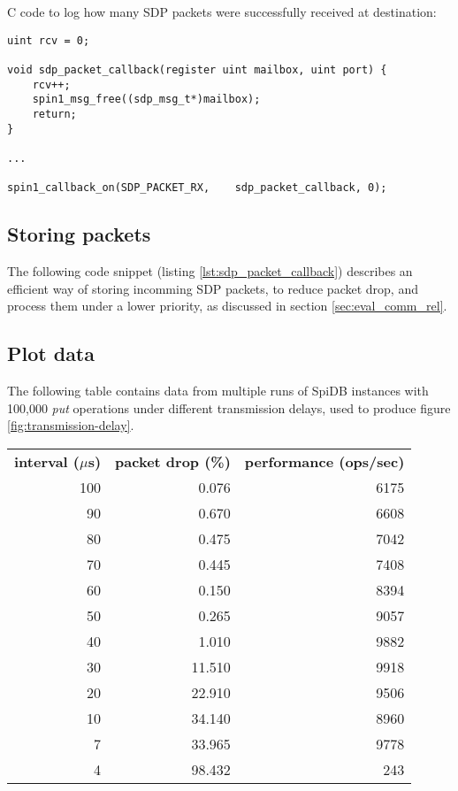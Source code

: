 C code to log how many SDP packets were successfully received at destination:

\begin{lstlisting}[caption={Destination}]
uint rcv = 0;

void sdp_packet_callback(register uint mailbox, uint port) {
    rcv++;
    spin1_msg_free((sdp_msg_t*)mailbox);
    return;
}

...

spin1_callback_on(SDP_PACKET_RX,    sdp_packet_callback, 0);

\end{lstlisting}


\subsection{Storing packets}
The following code snippet (listing \ref{lst:sdp_packet_callback}) describes an efficient way of storing incomming SDP packets, to reduce packet drop, and process them under a lower priority, as discussed in section \ref{sec:eval_comm_rel}.



\clearpage
\newpage

\subsection{Plot data}
The following table contains data from multiple runs of SpiDB instances with 100,000 \textit{put} operations under different transmission delays, used to produce figure \ref{fig:transmission-delay}.

\vspace{5mm}

\begin{tabular}{ r | r | r }
\textbf{interval ($\mu$s)} & \textbf{packet drop (\%)} & \textbf{performance (ops/sec)}  \\
100 & 0.076 	& 6175 \\
90	& 0.670		& 6608 \\
80	& 0.475		& 7042 \\
70	& 0.445		& 7408 \\
60	& 0.150		& 8394 \\
50	& 0.265		& 9057 \\
40	& 1.010		& 9882 \\
30	& 11.510	& 9918 \\
20	& 22.910	& 9506 \\ 
10	& 34.140	& 8960 \\
7	& 33.965 	& 9778 \\
4	& 98.432 	& 243 \\
\end{tabular}


%

